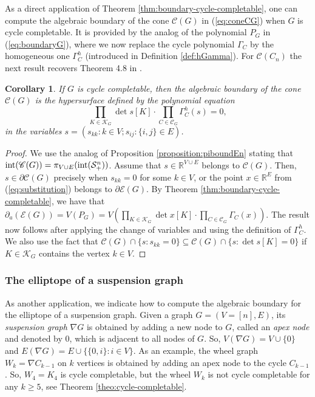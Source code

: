 \documentclass[a4paper, 11pt, twoside]{article}
\newcommand{\R}{\mathbb{R}}
\newcommand{\ME}{{\mathcal E}}
\newcommand{\MK}{{\mathcal K}}
\newcommand{\MC}{{\mathcal C}}
\theoremstyle{plain}
\newtheorem{corollary}[theorem]{Corollary}
\begin{document}
\noindent As a direct application of Theorem \ref{thm:boundary-cycle-completable}, one can compute the algebraic boundary of the cone $\mathscr{C}(G)$ in (\ref{eq:coneCG}) when $G$ is cycle completable. It is provided by the analog of the polynomial $P_G$ in (\ref{eq:boundaryG}), where we now replace the cycle polynomial $\Gamma_C$ by the homogeneous one $\Gamma_C^h$ (introduced in Definition \ref{def:hGamma}). For $\mathscr{C}(C_n)$ the next result recovers Theorem 4.8 in \cite{Sturmfels2010MultivariateGaussians}.

\begin{corollary}\label{cor:coneCG}
If $G$ is cycle completable, then the algebraic boundary of the cone $\mathscr{C}(G)$ is the hypersurface defined by the polynomial equation 
\[
\prod_{K\in\MK_G} \det s[K] \cdot \prod_{C\in\MC_G}\Gamma_C^h(s)=0,
\]
 in the variables $s=(s_{kk}: k\in V; s_{ij}: \{i,j\}\in E)$.
\end{corollary}

\begin{proof}
We use the analog of Proposition \ref{proposition:piboundEn} stating that ${\rm int}(\mathscr{C}(G)) = \pi_{V \cup E}({\rm int}({\cal S}_+^n))$.
Assume that $s\in \R^{V\cup E}$ belongs to $\mathscr{C}(G)$. Then, $s\in \partial \mathscr{C}(G)$ precisely when $s_{kk}=0$ for some $k\in V$, or the point $x\in\R^E$ from (\ref{eq:substitution}) belongs to $\partial \ME(G)$. 
By Theorem \ref{thm:boundary-cycle-completable}, we have that $\partial_a(\ME(G))=V(P_G)=V(\prod_{K\in\MK_G} \det x[K] \cdot\prod_{C\in\MC_G}\Gamma_C(x))$. The result now follows after applying the change of variables and using the definition of $\Gamma_C^h$. We also use the fact that $\mathscr{C}(G)\cap\{s: s_{kk}=0\} \subseteq \mathscr{C}(G)\cap\{s: \det s[K]=0\}$ if $K\in\MK_G$ contains the vertex $k\in V$.
\end{proof}

\subsubsection*{The elliptope of a suspension graph }

As another application, we indicate how to compute the algebraic boundary for the elliptope of a  suspension graph. 
Given a graph $G=(V=[n],E)$, its {\em suspension graph}  $\nabla G$ is  obtained by adding a new node to $G$, called an {\em apex node} and denoted by $0$, which is adjacent to all nodes of $G$. 
So, $V(\nabla G)=V\cup\{0\}$ and $E(\nabla G)= E\cup \{\{0,i\}: i\in V\}$.
As an example,   the wheel graph  $W_k=\nabla C_{k-1}$ on $k$ vertices is obtained by adding an apex node to the cycle $C_{k-1}$. So, $W_4=K_4$ is cycle completable, but  the wheel $W_k$ is not cycle completable for any $k\ge 5$, see Theorem \ref{theo:cycle-completable}.
\end{document}
